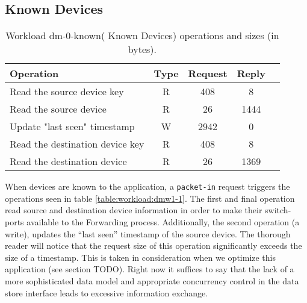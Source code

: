 \subsection{Known Devices}
\begin{table}[H]
\centering 
\begin{tabular}{l c c c c}
Operation & Type & Request & Reply \\ \toprule 

Read the source device key & R & 408 & 8\\\midrule
Read the source device & R & 26 & 1444\\\midrule
Update "last seen" timestamp & W & 2942 & 0\\\midrule
Read the destination device key & R & 408 & 8\\\midrule
Read the destination device & R & 26 & 1369 \\\bottomrule
\end{tabular}
\caption[Workload dm-0-known( Known Devices) operations]{Workload dm-0-known( Known Devices) operations and sizes (in bytes).}
\end{table}
When devices are known to the application, a \texttt{packet-in} request
triggers the operations seen in table \ref{table:workload:dmw1-1}. The
first and final operation  read source and destination device
information in order to make their switch-ports available to the
Forwarding process. Additionally, the second operation
(a write), updates the ``last seen'' timestamp of the source
device.  The thorough reader will notice that the request size of this
operation significantly exceeds the size of  a timestamp. This is
taken in consideration when we optimize this application (see
section TODO). Right now it suffices to say that the lack of a more
sophisticated data model  and appropriate concurrency control in the
data store interface leads to excessive information exchange. 

